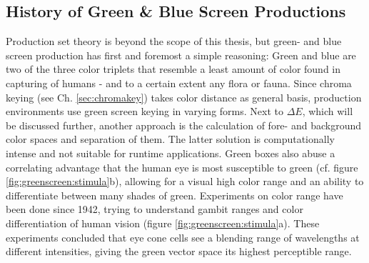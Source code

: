 \subsection{History of Green \& Blue Screen Productions}

Production set theory is beyond the scope of this thesis, but green- and blue 
screen production has first and foremost a simple reasoning: Green and blue are 
two of the three color triplets that resemble a least amount of color found in 
capturing of humans - and to a certain extent any flora or fauna. Since chroma 
keying (see Ch. \ref{sec:chromakey}) takes color distance as general basis, 
production environments use green screen keying in varying forms. Next to 
$\Delta E$, which will be discussed further, another approach is the 
calculation of fore- and background color spaces and separation of them. The 
latter solution is computationally intense and not suitable for runtime 
applications. \cite{disney:unmixing:2017}
\newline
Green boxes also abuse a correlating advantage that the human eye is most 
susceptible to green (cf. figure \ref{fig:greenscreen:stimula}b), allowing for 
a visual high color range and an ability to differentiate between many shades of
green. Experiments on color range have been done since 1942, trying to 
understand gambit ranges and color differentiation of human vision (figure 
\ref{fig:greenscreen:stimula}a). These experiments concluded that eye cone 
cells see a blending range of wavelengths at different intensities, giving the 
green vector space its highest perceptible range. \cite{MacAdam:1942}

